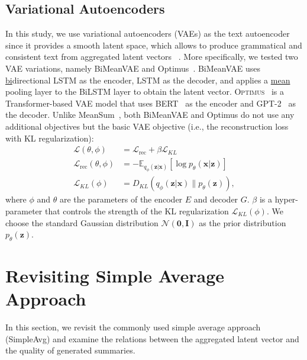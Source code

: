 \documentclass[11pt]{article}
\newcommand{\name}{\mbox{\sc BiMeanVAE}}
\newcommand{\simpleavg}{\mbox{SimpleAvg}}
\newcommand{\hl}[1]{#1}
\begin{document}
\subsection{Variational Autoencoders}\label{sec:vae}
In this study, we use variational autoencoders (VAEs) as the text autoencoder
since it provides a smooth latent space, which allows to \hl{produce grammatical and consistent text from aggregated latent vectors
~\cite{kingma2014auto,bowman-etal-2016-generating}}. More specifically, we tested two VAE variations, namely \name{} and Optimus~\cite{li-etal-2020-optimus}. \name{} 
uses \underline{bi}directional LSTM as the encoder, LSTM as the decoder, and applies a \underline{mean} pooling layer to the BiLSTM layer to obtain the latent vector. \textsc{Optimus}~\cite{li-etal-2020-optimus} is a Transformer-based VAE model that uses BERT~\cite{devlin-etal-2019-bert} as the encoder and GPT-2~\cite{radford2019language} as the decoder.
Unlike MeanSum~\cite{Chu:2019:MeanSum},
both \name{} and Optimus do not use any additional objectives but the basic VAE objective (i.e., the reconstruction loss with KL regularization):\setlength{\abovedisplayskip}{2mm}
\setlength{\belowdisplayskip}{2mm}
\begin{align*}
    \mathcal{L}(\theta, \phi) &= \mathcal{L}_{\text{rec}}+ \beta \mathcal{L}_{KL} \\
    \mathcal{L}_{\text{rec}}(\theta, \phi) &= - \mathbb{E}_{q_{\phi}(\boldsymbol{z}|\boldsymbol{x})}[\log p_{\theta}(\boldsymbol{x}|\boldsymbol{z})]\\
    \mathcal{L}_{KL}(\phi) &= D_{KL}(q_{\phi}(\boldsymbol{z}| \boldsymbol{x}) \| p_{\theta}(\boldsymbol{z})),
\end{align*}
where $\phi$ and $\theta$ are the parameters of the encoder $E$ and decoder $G$.
$\beta$ is a hyper-parameter that controls the strength of the KL regularization $\mathcal{L}_{KL}(\phi)$.
We choose the standard Gaussian distribution $\mathcal{N}(\boldsymbol{0}, \boldsymbol{I})$ as the prior distribution $p_\theta(\boldsymbol{z})$.

\section{Revisiting Simple Average Approach}\label{sec:revisiting}

In this section, we revisit the commonly used simple average approach (\simpleavg) and examine the relations between the aggregated latent vector and the quality of generated summaries.
\end{document}
